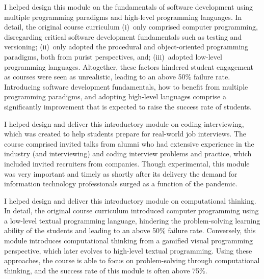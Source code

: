 \documentclass[11pt,a4paper,sans]{moderncv} %
\begin{document}
%
{I helped design this module on the fundamentals of software development using multiple programming paradigms and high-level programming languages. In detail, the original course curriculum (i)~only comprised computer programming, disregarding critical software development fundamentals such as testing and versioning; (ii)~only adopted the procedural and object-oriented programming paradigms, both from purist perspectives, and; (iii)~adopted low-level programming languages. Altogether, these factors hindered student engagement as courses were seen as unrealistic, leading to an above 50\% failure rate. Introducing software development fundamentals, how to benefit from multiple programming paradigms, and adopting high-level languages comprise a significantly improvement that is expected to raise the success rate of students.}

%
{I helped design and deliver this introductory module on coding interviewing, which was created to help students prepare for real-world job interviews. The course comprised invited talks from alumni who had extensive experience in the industry (and interviewing) and coding interview problems and practice, which included invited recruiters from companies. Though experimental, this module was very important and timely as shortly after its delivery the demand for information technology professionals surged as a function of the pandemic.}

%
{I helped design and deliver this introductory module on computational thinking. In detail, the original course curriculum introduced computer programming using a low-level textual programming language, hindering the problem-solving learning ability of the students and leading to an above 50\% failure rate. Conversely, this module introduces computational thinking from a gamified visual programming perspective, which later evolves to high-level textual programming. Using these approaches, the course is able to focus on problem-solving through computational thinking, and the success rate of this module is often above 75\%.}
\end{document}
